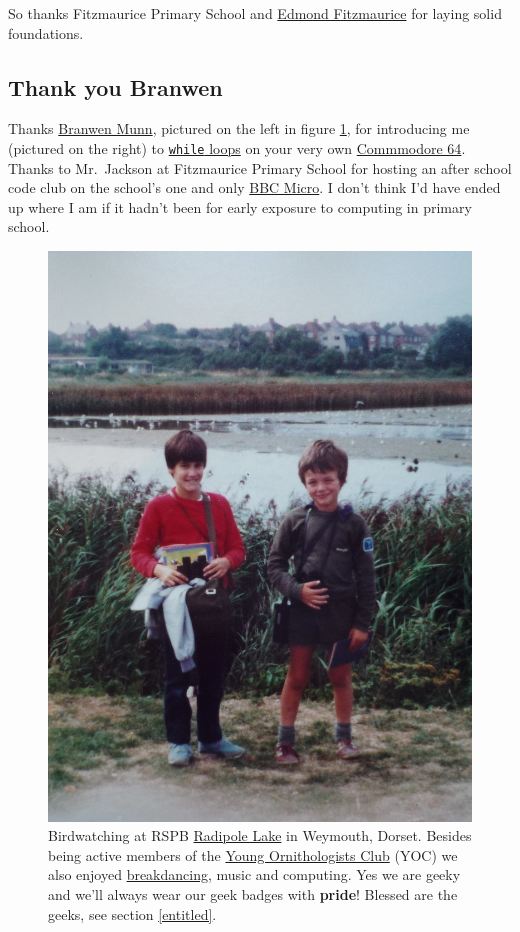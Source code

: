 \documentclass[
]{book}
\begin{document}
So thanks Fitzmaurice Primary School and \href{https://en.wikipedia.org/wiki/Edmond_Fitzmaurice,_1st_Baron_Fitzmaurice}{Edmond Fitzmaurice} for laying solid foundations. 🙏

\hypertarget{branwen}{%
\subsection{Thank you Branwen}\label{branwen}}

Thanks \href{https://www.branwen.online/}{Branwen Munn}, pictured on the left in figure \ref{fig:branwen-fig}, for introducing me (pictured on the right) to \href{https://en.wikipedia.org/wiki/While_loop}{\texttt{while} loops} on your very own \href{https://en.wikipedia.org/wiki/Commodore_64}{Commmodore 64}. Thanks to Mr.~Jackson at Fitzmaurice Primary School for hosting an after school code club on the school's one and only \href{https://en.wikipedia.org/wiki/BBC_Micro}{BBC Micro}. I don't think I'd have ended up where I am if it hadn't been for early exposure to computing in primary school.

\begin{figure}

{\centering \includegraphics[width=0.5\linewidth]{images/radipole-lake} 

}

\caption{Birdwatching at RSPB \href{https://en.wikipedia.org/wiki/Radipole_Lake}{Radipole Lake} in Weymouth, Dorset. Besides being active members of the \href{https://en.wikipedia.org/wiki/Young_Ornithologists\%27_Club}{Young Ornithologists Club} (YOC) we also enjoyed \href{https://en.wikipedia.org/wiki/Breakdancing}{breakdancing}, music and computing. Yes we are geeky and we'll always wear our geek badges with \textbf{pride}! Blessed are the geeks, see section \ref{entitled}.}\label{fig:branwen-fig}
\end{figure}
\end{document}
